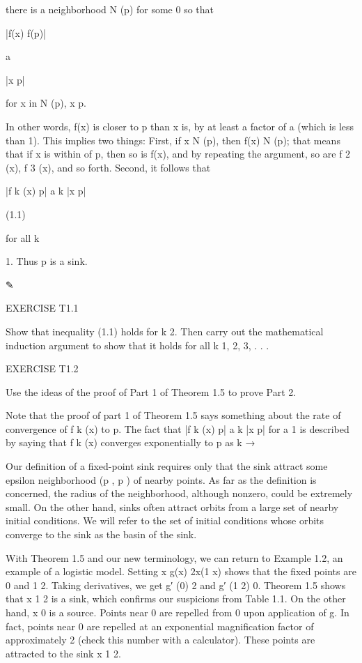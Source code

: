 \documentclass[12pt]{article}
\begin{document}
there is a neighborhood N  (p) for some  
 0 so that

|f(x)  f(p)|

 a

|x  p|

for x in N  (p), x p.

In other words, f(x) is closer to p than x is, by at least a factor of a (which is less than 1). This 
implies two things: First, if x  N  (p), then f(x)  N  (p); that means that if x is within  of p, then so 
is f(x), and by repeating the argument, so are f 2 (x), f 3 (x), and so forth. Second, it follows that

|f k (x)  p| a k |x  p|

(1.1)

for all k


 1. Thus p is a sink.

✎

EXERCISE T1.1

Show that inequality (1.1) holds for k  2. Then carry out the mathematical induction argument to show that 
it holds for all k  1, 2, 3, . . .

EXERCISE T1.2

Use the ideas of the proof of Part 1 of Theorem 1.5 to prove Part 2.

Note that the proof of part 1 of Theorem 1.5 says something about the rate of convergence of f k (x) to p. 
The fact that |f k (x)  p| a k |x  p| for a  1 is described by saying that f k (x) converges exponentially 
to p as k → 


Our deﬁnition of a ﬁxed-point sink requires only that the sink attract some epsilon neighborhood (p  , p  
) of nearby points. As far as the deﬁnition is concerned, the radius  of the neighborhood, although 
nonzero, could be extremely small. On the other hand, sinks often attract orbits from a large set of nearby 
initial conditions. We will refer to the set of initial conditions whose orbits converge to the sink as the 
basin of the sink.

With Theorem 1.5 and our new terminology, we can return to Example 1.2, an example of a logistic model. 
Setting x  g(x)  2x(1  x) shows that the ﬁxed points are 0 and 1  2. Taking derivatives, we get g′ (0)  2 
and g′ (1  2)  0. Theorem 1.5 shows that x  1  2 is a sink, which conﬁrms our suspicions from Table 1.1. 
On the other hand, x  0 is a source. Points near 0 are repelled from 0 upon application of g. In fact, 
points near 0 are repelled at an exponential magniﬁcation factor of approximately 2 (check this number 
with a calculator). These points are attracted to the sink x  1  2.
\end{document}
